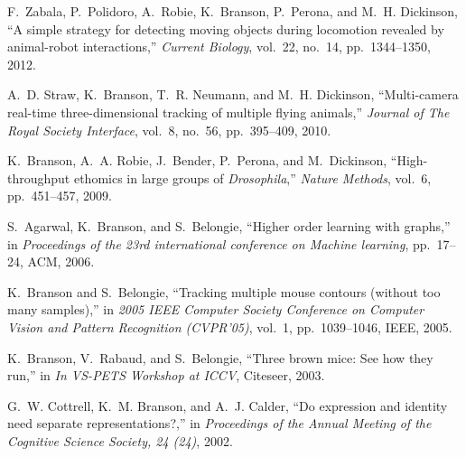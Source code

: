 \begin{cvenum}
\item F.~Zabala, P.~Polidoro, A.~Robie, K.~Branson, P.~Perona, and M.~H. Dickinson,
  ``A simple strategy for detecting moving objects during locomotion revealed
  by animal-robot interactions,'' {\em Current Biology}, vol.~22, no.~14,
  pp.~1344--1350, 2012.

\item A.~D. Straw, K.~Branson, T.~R. Neumann, and M.~H. Dickinson, ``Multi-camera
  real-time three-dimensional tracking of multiple flying animals,'' {\em
  Journal of The Royal Society Interface}, vol.~8, no.~56, pp.~395--409, 2010.

\item K.~Branson, A.~A. Robie, J.~Bender, P.~Perona, and M.~Dickinson,
  ``High-throughput ethomics in large groups of \emph{{D}rosophila},'' {\em
  Nature Methods}, vol.~6, pp.~451--457, 2009.

\item S.~Agarwal, K.~Branson, and S.~Belongie, ``Higher order learning with graphs,''
  in {\em Proceedings of the 23rd international conference on Machine
  learning}, pp.~17--24, ACM, 2006.

\item K.~Branson and S.~Belongie, ``Tracking multiple mouse contours (without too
  many samples),'' in {\em 2005 IEEE Computer Society Conference on Computer
  Vision and Pattern Recognition (CVPR'05)}, vol.~1, pp.~1039--1046, IEEE,
  2005.

\item K.~Branson, V.~Rabaud, and S.~Belongie, ``Three brown mice: See how they run,''
  in {\em In VS-PETS Workshop at ICCV}, Citeseer, 2003.

\item G.~W. Cottrell, K.~M. Branson, and A.~J. Calder, ``Do expression and identity
  need separate representations?,'' in {\em Proceedings of the Annual Meeting
  of the Cognitive Science Society, 24 (24)}, 2002.

\end{cvenum}
